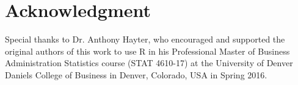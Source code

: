 %
%
%
%
%

\section{Acknowledgment}

Special thanks to Dr. Anthony Hayter, who encouraged and supported the 
original authors of this work to use R in his Professional Master of 
Business Administration Statistics course (STAT 4610-17) at the 
University of Denver Daniels College of Business in Denver, Colorado, 
USA in Spring 2016.